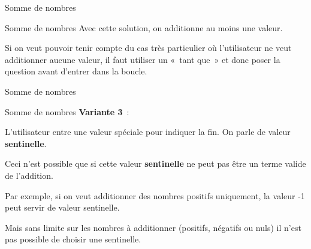 \begin{frame}{Somme de nombres}
\end{frame}

\begin{frame}{Somme de nombres}
	Avec cette solution, on additionne au moins une valeur. 
	
	\bigskip
	
	Si on veut pouvoir tenir compte du
	cas très particulier où l'utilisateur ne veut
	additionner aucune valeur, il faut utiliser un «~tant que~» et donc
	poser la question avant d'entrer dans la boucle.
\end{frame}

\begin{frame}{Somme de nombres}
\end{frame}

\begin{frame}{Somme de nombres}
	\textbf{Variante 3}~:
	
	L'utilisateur entre une valeur spéciale pour indiquer la fin. 
	On parle de valeur \textbf{sentinelle}. 
	
	\bigskip
	
	Ceci n'est possible que si cette valeur \textbf{sentinelle} ne peut pas être
	un terme valide de l'addition. 
	
	\bigskip
	
	Par exemple, si on veut
	additionner des nombres positifs uniquement, la valeur -1 peut servir
	de valeur sentinelle. 
	
	\bigskip
	
	Mais sans limite sur les nombres à additionner
	(positifs, négatifs ou nuls) il n'est pas possible de
	choisir une sentinelle.
\end{frame}

